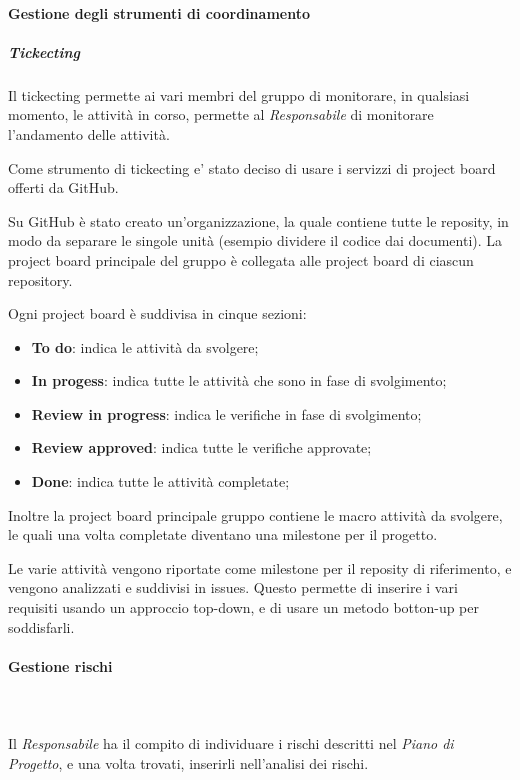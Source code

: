    			\paragraph{Gestione degli strumenti di coordinamento}
   				\subparagraph{Tickecting}
   					Il tickecting permette ai vari membri del gruppo di monitorare, in qualsiasi momento, le attività in corso, permette al \textit{Responsabile} di monitorare l'andamento delle attività.

   					Come strumento di tickecting e' stato deciso di usare i servizzi di project board offerti da GitHub.

   					Su GitHub è stato creato un'organizzazione, la quale contiene tutte le reposity, in modo da separare le singole unità (esempio dividere il codice dai documenti).
   					La project board principale del gruppo è collegata alle project board di ciascun repository.

   					Ogni project board è suddivisa in cinque sezioni:
   					\begin{itemize}
   						\item \textbf{To do}: indica le attività da svolgere;
   						\item \textbf{In progess}: indica tutte le attività che sono in fase di svolgimento;
   						\item \textbf{Review in progress}: indica le verifiche in fase di svolgimento;
   						\item \textbf{Review approved}: indica tutte le verifiche approvate;
   						\item \textbf{Done}: indica tutte le attività completate;
   					\end{itemize}
   					Inoltre la project board principale gruppo contiene le macro attività da svolgere, le quali una volta completate diventano una milestone per il progetto.

   					Le varie attività vengono riportate come milestone per il reposity di riferimento, e vengono analizzati e suddivisi in issues. Questo permette di inserire i vari requisiti usando un approccio top-down, e di usare un metodo botton-up per soddisfarli.
   			\paragraph{Gestione rischi}\mbox{}\\ \mbox{}\\
   				Il \textit{Responsabile} ha il compito di individuare i rischi descritti nel \textit{Piano di Progetto\docs}, e una volta trovati, inserirli nell'analisi dei rischi.

